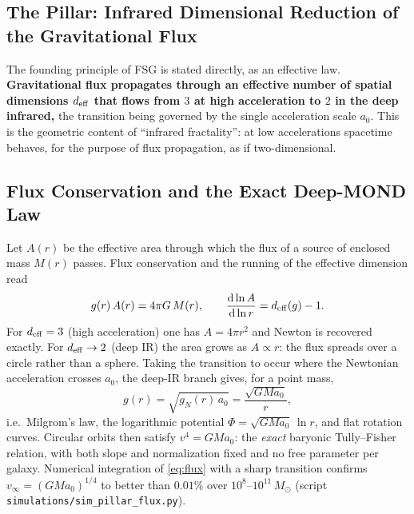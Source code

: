 \documentclass[11pt,a4paper]{article}
\begin{document}
\begin{onehalfspacing}
\section{The Pillar: Infrared Dimensional Reduction of the Gravitational Flux}
\label{sec:pillar}
The founding principle of FSG is stated directly, as an effective law. \textbf{Gravitational flux propagates through an effective number of spatial dimensions $d_{\rm eff}$ that flows from $3$ at high acceleration to $2$ in the deep infrared,} the transition being governed by the single acceleration scale $a_0$. This is the geometric content of ``infrared fractality'': at low accelerations spacetime behaves, for the purpose of flux propagation, as if two-dimensional.
\subsection{Flux Conservation and the Exact Deep-MOND Law}
Let $A(r)$ be the effective area through which the flux of a source of enclosed mass $M(r)$ passes. Flux conservation and the running of the effective dimension read
\begin{equation}
g(r)\,A(r) = 4\pi G\,M(r), \qquad \frac{\mathrm{d}\ln A}{\mathrm{d}\ln r} = d_{\rm eff}(g) - 1 .
\label{eq:flux}
\end{equation}
For $d_{\rm eff}=3$ (high acceleration) one has $A=4\pi r^2$ and Newton is recovered exactly. For $d_{\rm eff}\to 2$ (deep IR) the area grows as $A\propto r$: the flux spreads over a circle rather than a sphere. Taking the transition to occur where the Newtonian acceleration crosses $a_0$, the deep-IR branch gives, for a point mass,
\begin{equation}
g(r) = \sqrt{g_N(r)\,a_0} = \frac{\sqrt{GM a_0}}{r},
\label{eq:deepmond}
\end{equation}
i.e.\ Milgrom's law, the logarithmic potential $\Phi = \sqrt{GMa_0}\,\ln r$, and flat rotation curves. Circular orbits then satisfy $v^4 = GM a_0$: the \emph{exact} baryonic Tully--Fisher relation, with both slope and normalization fixed and no free parameter per galaxy. Numerical integration of \eqref{eq:flux} with a sharp transition confirms $v_\infty=(GMa_0)^{1/4}$ to better than $0.01\%$ over $10^8$--$10^{11}\,M_\odot$ (script \texttt{simulations/sim\_pillar\_flux.py}).

\end{onehalfspacing}
\end{document}
